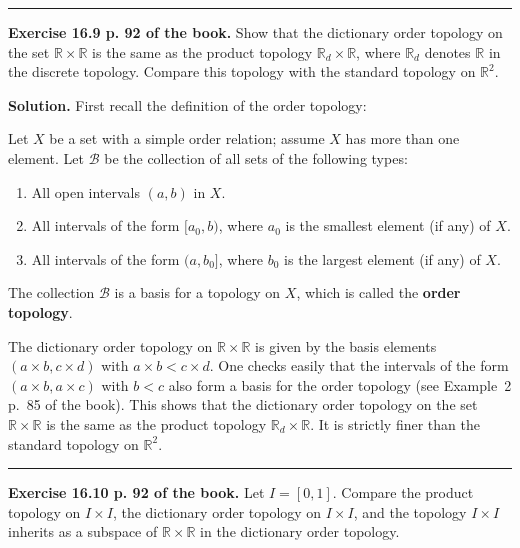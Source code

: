 \documentclass[12pt,letterpaper]{article}
\newcommand{\hs}{\bigskip\hrule\medskip}
\newcommand{\noi}{\noindent}%
\newcommand{\R}{\mathbb R}
\begin{document}
\hs

\noi\textbf{Exercise 16.9 p. 92 of the book.} Show that the dictionary order topology on the set $\R\times\R$ is the same as the product topology $\R_d\times\R$, where $\R_d$ denotes $\R$ in the discrete topology. Compare this topology with the standard topology on $\R^2$. 

\noi\textbf{Solution.} First recall the definition of the order topology: 

Let $X$ be a set with a simple order relation; assume $X$ has more than one element. Let $\mathcal{B}$ be the collection of all sets of the following types:
\begin{enumerate}
    \item All open intervals $(a,b)$ in $X$.
    \item All intervals of the form $[a_0,b)$, where $a_0$ is the smallest element (if any) of $X$.
    \item All intervals of the form $(a,b_0]$, where $b_0$ is the largest element (if any) of $X$.
\end{enumerate}
The collection $\mathcal{B}$ is a basis for a topology on $X$, which is called the \textbf{order topology}. 

The dictionary order topology on $\R\times\R$ is given by the basis elements $(a\times b,c\times d)$ with $a\times b<c\times d$. One checks easily that the intervals of the form $(a\times b,a\times c)$ with $b<c$ also form a basis for the order topology (see Example~2 p.~85 of the book). This shows that the dictionary order topology on the set $\R\times\R$ is the same as the product topology $\R_d\times\R$. It is strictly finer than the standard topology on $\R^2$. 

\hs


\noi\textbf{Exercise 16.10 p. 92 of the book.} Let $I=[0,1]$. Compare the product topology on $I\times I$, the dictionary order topology on $I\times I$, and the topology $I\times I$ inherits as a subspace of $\R\times\R$ in the dictionary order topology. 
\end{document}
